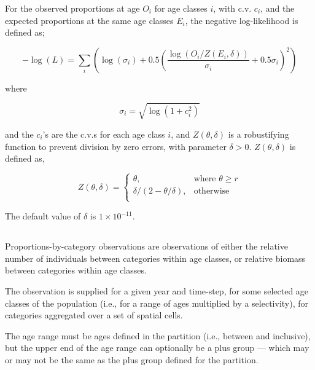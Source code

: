 {{{{{{For the observed proportions at age $O_i$ for age classes $i$, with c.v. $c_i$, and the expected proportions at the same age classes $E_i$, the negative log-likelihood is defined as; 

\begin{equation}
 - \log \left(L \right) = \sum\limits_i \left( \log \left( \sigma _i \right) + 0.5\left( \frac{\log \left(O_i / Z \left(E_i,\delta \right) \right)}{\sigma_i} + 0.5 \sigma_i \right)^2 \right)
\end{equation}

where 

\begin{equation}
  \sigma_i  = \sqrt{\log \left(1+c_i^2 \right)}
\end{equation}

and the $c_i$'s are the c.v.s for each age class $i$, and $Z \left(\theta,\delta \right)$ is a robustifying function to prevent division by zero errors, with parameter $\delta>0$. $Z \left(\theta,\delta \right)$ is defined as,

\begin{equation}
   Z \left(\theta,\delta \right) = \begin{cases}
	  \theta, & \text{where $\theta \ge r$} \\
	  \delta/\left( 2-\theta/\delta \right), & \text{otherwise} \\  
  \end{cases}
\end{equation}

The default value of $\delta$ is $1 \times 10^{-11}$.

\subsection{\label{sec:proportions-by-category}}
Proportions-by-category observations are observations of either the relative number of individuals between categories within age classes, or relative biomass between categories within age classes. 

The observation is supplied for a given year and time-step, for some selected age classes of the population (i.e., for a range of ages multiplied by a selectivity), for categories aggregated over a set of spatial cells. 

The age range must be ages defined in the partition (i.e., between  and  inclusive), but the upper end of the age range can optionally be a plus group --- which may or may not be the same as the plus group defined for the partition. 

}}}}}}
